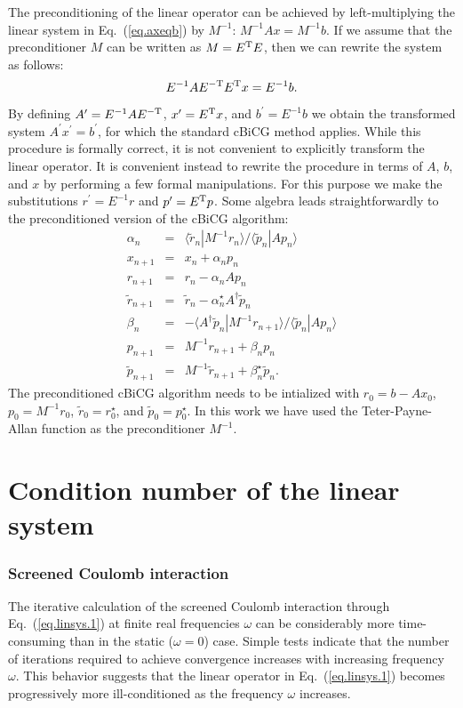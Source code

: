 \documentclass[twocolumn,prb,showpacs,superscriptaddress]{revtex4}
\def\w{\omega}
\def\>{\rangle}
\def\<{\langle}
\def\rt{\tilde{r}}
\def\pt{\tilde{p}}
\begin{document}
The preconditioning of the linear operator can be achieved by left-multiplying the linear system 
in Eq.\ (\ref{eq.axeqb}) 
by $M^{-1}$: $M^{-1}Ax=M^{-1}b$. If we assume that the preconditioner $M$ can be 
written as $M=E^{\rm T}E$, then we can rewrite the system as follows:
  \begin{equation}
  E^{-1}AE^{-{\rm T}} E^{\rm T}x = E^{-1}b.
  \end{equation}
By defining $A^\prime=E^{-1}AE^{-{\rm T}}$, $x^\prime=E^{\rm T}x$, and $b^\prime=E^{-1}b$
we obtain the transformed system $A^\prime x^\prime=b^\prime$, for which the
standard cBiCG method applies.
While this procedure is formally correct, it is not convenient to explicitly
transform the linear operator.
It is convenient instead to rewrite the procedure in terms of
$A$, $b$, and $x$ by performing a few formal manipulations.
For this purpose we make the substitutions
$r^\prime = E^{-1}r$ and $p^\prime=E^{\rm T} p$. Some algebra leads straightforwardly
to the preconditioned version of the cBiCG algorithm:
  \begin{eqnarray}
  \alpha_n & = & \<\rt_n|M^{-1}r_n\>/\<\pt_n|Ap_n\>  \\
  x_{n+1} & = & x_n + \alpha_n p_n \\ 
  r_{n+1} & = & r_n - \alpha_n Ap_n \\ 
  \rt_{n+1} & = & \rt_n - \alpha_n^\star A^\dagger \pt_n \\ 
  \beta_n & = & - \<A^\dagger\pt_n|M^{-1}r_{n+1}\>/\<\pt_n|Ap_n\> \\ 
  p_{n+1} & = & M^{-1}r_{n+1} + \beta_n p_n \\ 
  \pt_{n+1} & = & M^{-1}\rt_{n+1} + \beta_n^\star \pt_n.
  \end{eqnarray}
The preconditioned  cBiCG algorithm needs to be intialized with
$r_0=b-Ax_0$, $p_0=M^{-1}r_0$, $\rt_0=r_0^\star$, and $\pt_0=p_0^\star$.
In this work we have used the Teter-Payne-Allan function as the preconditioner 
$M^{-1}$.\cite{tpa}

\section{Condition number of the linear system}\label{app.condition}

\subsubsection{Screened Coulomb interaction}

The iterative calculation of the screened Coulomb interaction through 
Eq.\ (\ref{eq.linsys.1}) at finite real
frequencies $\w$ can be considerably more time-consuming than in the static
($\w\!=\!0$) case. Simple tests indicate that 
the number of iterations required to achieve convergence increases with 
increasing frequency $\w$. This behavior suggests that the linear operator in
Eq.\ (\ref{eq.linsys.1}) becomes progressively more ill-conditioned 
as the frequency $\w$ increases.
\end{document}
